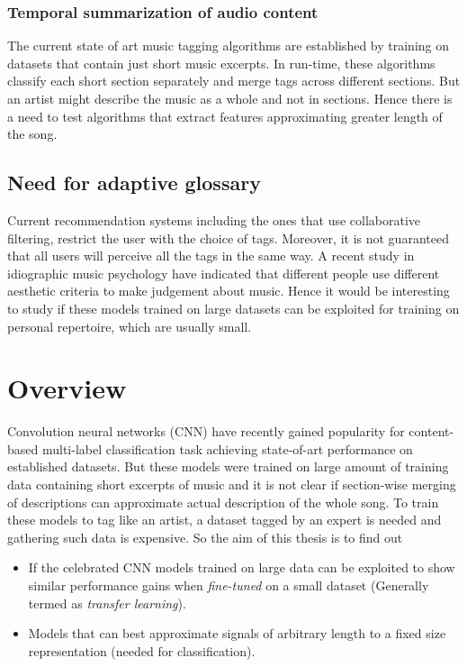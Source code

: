 \subsubsection{Temporal summarization of audio content}
The current state of art music tagging algorithms\cite{choi_crnn}\cite{MultiScale} are established by training on datasets that contain just short music excerpts. In run-time, these algorithms classify each short section separately and merge tags across different sections. But an artist might describe the music as a whole and not in sections. Hence there is a need to test algorithms that extract features approximating greater length of the song. 

\subsection{Need for adaptive glossary}
Current recommendation systems including the ones that use collaborative filtering, restrict the user with the choice of tags. Moreover, it is not guaranteed that all users will perceive all the tags in the same way. A recent study in idiographic music psychology have indicated that different people use different aesthetic criteria to make judgement about music\cite{NoAccountingForTaste}. Hence it would be interesting to study if these models \cite{choi_cnn}\cite{choi_crnn} trained on large datasets can be exploited for training on personal repertoire, which are usually small.  


\section{Overview}
\label{overview}
Convolution neural networks (CNN) have recently gained popularity for content-based multi-label classification task achieving state-of-art performance on established datasets\cite{choi_cnn}\cite{choi_crnn}. But these models were trained on large amount of training data containing short excerpts of music and it is not clear if section-wise merging of descriptions can approximate actual description of the whole song. To train these models to tag like an artist, a dataset tagged by an expert is needed and gathering such data is expensive. So the aim of this thesis is to find out
\begin{itemize}
\setlength\itemsep{0em}
\item If the celebrated CNN models trained on large data can be exploited to show similar performance gains when \textit{fine-tuned} on a small dataset (Generally termed as \textit{transfer learning}).
\item Models that can best approximate signals of arbitrary length to a fixed size representation (needed for classification).
\end{itemize} 
    
